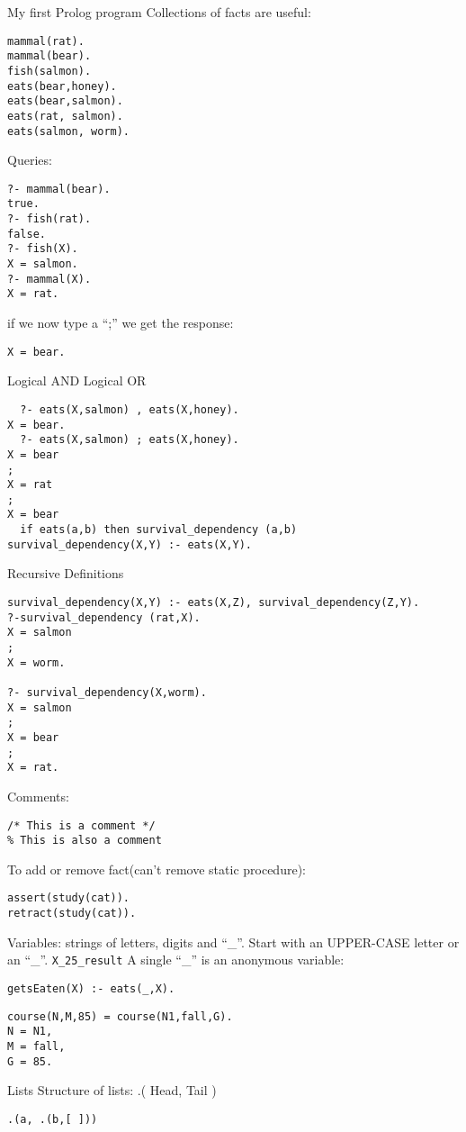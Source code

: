         My first Prolog program
        Collections of facts are useful:
\begin{verbatim}
mammal(rat).
mammal(bear).
fish(salmon).
eats(bear,honey).
eats(bear,salmon).
eats(rat, salmon).
eats(salmon, worm).
\end{verbatim}

        Queries:
\begin{verbatim}
?- mammal(bear).
true.
?- fish(rat).
false.
?- fish(X).
X = salmon.
?- mammal(X).
X = rat.
\end{verbatim}
        if we now type a “;” we get the response:
\begin{verbatim}
X = bear.
\end{verbatim}

        Logical AND
        Logical OR
\begin{verbatim}
  ?- eats(X,salmon) , eats(X,honey).
X = bear.
  ?- eats(X,salmon) ; eats(X,honey).
X = bear
;
X = rat
;
X = bear
  if eats(a,b) then survival_dependency (a,b)
survival_dependency(X,Y) :- eats(X,Y).
\end{verbatim}

        Recursive Definitions
\begin{verbatim}
survival_dependency(X,Y) :- eats(X,Z), survival_dependency(Z,Y).
?-survival_dependency (rat,X).
X = salmon
;
X = worm.

?- survival_dependency(X,worm).
X = salmon
;
X = bear
;
X = rat.

\end{verbatim}
        Comments:
\begin{verbatim}
/* This is a comment */
% This is also a comment
\end{verbatim}

        To add or remove fact(can’t remove static procedure):
\begin{verbatim}
assert(study(cat)).
retract(study(cat)).
\end{verbatim}

Variables: strings of letters, digits and “\_”. Start with an UPPER-CASE letter or an “\_”. 
\verb+X_25_result+ A single “\_” is an anonymous variable:
\begin{verbatim}
getsEaten(X) :- eats(_,X).
\end{verbatim}

\begin{verbatim}
course(N,M,85) = course(N1,fall,G).
N = N1,
M = fall,
G = 85.
\end{verbatim}

        Lists
        Structure of lists: .( Head, Tail )
\begin{verbatim}
.(a, .(b,[ ]))
\end{verbatim}


